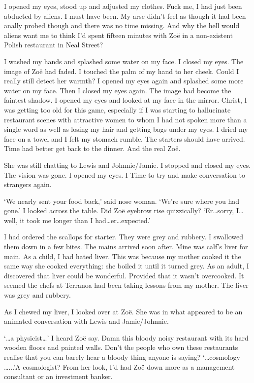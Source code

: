 I opened my eyes, stood up and adjusted my clothes. Fuck me, I had just been abducted by aliens. I must have been. My arse didn't feel as though it had been anally probed though and there was no time missing. And why the hell would aliens want me to think I'd spent fifteen minutes with Zoë in a non-existent Polish restaurant in Neal Street?

I washed my
hands and splashed some water on my face. I closed my eyes. The
image of Zoë had faded. I touched the palm of my hand to her cheek. Could I really still detect her warmth? I opened my eyes again and splashed some more
water on my face. Then I closed my eyes again. The image had become the
faintest shadow. I opened my eyes and looked at my
face in the mirror. Christ, I was getting too old for this game, especially if I was starting to hallucinate restaurant scenes with attractive women to whom I had not spoken more than a single word as well as losing my hair and getting bags under my eyes. I dried my face on a towel
and I felt my stomach rumble. The starters should have arrived. Time had better get back to the
dinner. And the real Zoë.

She was still chatting to Lewis and Johnnie/Jamie. I stopped and closed my eyes. The vision was gone. I opened my eyes. I Time to try and make
conversation to strangers again.

`We nearly sent your food back,' said nose woman. `We're sure where you had gone.' I looked across the table. Did Zoë eyebrow rise quizzically? `Er\dots sorry, I\dots well, it took me longer than I had\dots er\dots expected.'

I had ordered the scallops for
starter. They were grey and rubbery. I swallowed them down in a few bites. The mains arrived soon after. Mine was calf's liver for main. As a child, I had hated
liver. This was because my mother cooked it the same way she cooked
everything: she boiled it until it turned grey. As an adult, I
discovered that liver could be wonderful. Provided that it
wasn't overcooked. It seemed the chefs at Terranoa had been taking
lessons from my mother.  The
liver was grey and rubbery.

As I chewed my liver, I looked over at Zoë. She was in
what appeared to be an animated conversation with Lewis and Jamie/Johnnie.

`{\dots}a physicist\dots' I heard Zoë say. Damn this bloody
noisy restaurant with its hard wooden floors and painted walls.
Don't the people who own these restaurants realise that you can
barely hear a bloody thing anyone is saying? `{\dots}cosmology
\dots...'A cosmologist? From her look, I'd had Zoë down more as a management
consultant or an investment banker.

